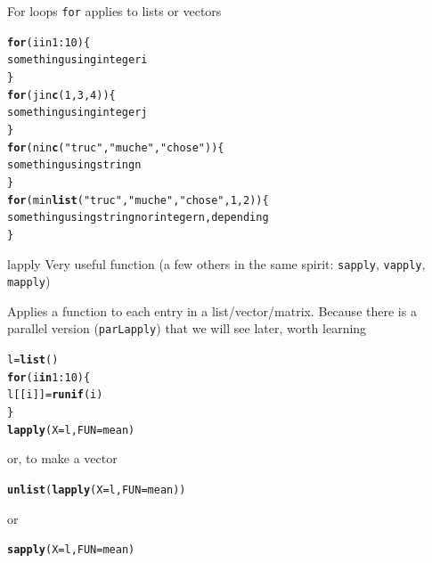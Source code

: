 \documentclass[aspectratio=169]{beamer}\usepackage[]{graphicx}\usepackage[]{xcolor}
\makeatletter
\newcommand{\hlnum}[1]{\textcolor[rgb]{0.686,0.059,0.569}{#1}}%
\newcommand{\hlsng}[1]{\textcolor[rgb]{0.192,0.494,0.8}{#1}}%
\newcommand{\hlopt}[1]{\textcolor[rgb]{0,0,0}{#1}}%
\newcommand{\hldef}[1]{\textcolor[rgb]{0.345,0.345,0.345}{#1}}%
\newcommand{\hlkwa}[1]{\textcolor[rgb]{0.161,0.373,0.58}{\textbf{#1}}}%
\newcommand{\hlkwb}[1]{\textcolor[rgb]{0.69,0.353,0.396}{#1}}%
\newcommand{\hlkwc}[1]{\textcolor[rgb]{0.333,0.667,0.333}{#1}}%
\newcommand{\hlkwd}[1]{\textcolor[rgb]{0.737,0.353,0.396}{\textbf{#1}}}%
\newenvironment{kframe}{%
 \def\at@end@of@kframe{}%
 \ifinner\ifhmode%
  \def\at@end@of@kframe{\end{minipage}}%
  \begin{minipage}{\columnwidth}%
 \fi\fi%
 \def\FrameCommand##1{\hskip\@totalleftmargin \hskip-\fboxsep
 \colorbox{shadecolor}{##1}\hskip-\fboxsep
     \hskip-\linewidth \hskip-\@totalleftmargin \hskip\columnwidth}%
 \MakeFramed {\advance\hsize-\width
   \@totalleftmargin\z@ \linewidth\hsize
   \@setminipage}}%
 {\par\unskip\endMakeFramed%
 \at@end@of@kframe}
\newenvironment{knitrout}{}{} %
\makeatother
\begin{document}
\begin{frame}[fragile]{For loops}
\texttt{for} applies to lists or vectors

\begin{knitrout}
\color{fgcolor}\begin{kframe}
\begin{alltt}
\hlkwd{for} (i in 1:10) \{
  something using integer i
\}
\hlkwd{for} (j in \hlkwd{c}(1,3,4)) \{
  something using integer j
\}
\hlkwd{for} (n in \hlkwd{c}(\hlsng{"truc"}, \hlsng{"muche"}, \hlsng{"chose"})) \{
  something using string n
\}
\hlkwd{for} (m in \hlkwd{list}(\hlsng{"truc"}, \hlsng{"muche"}, \hlsng{"chose"}, 1, 2)) \{
  something using string n or integer n, depending
\}
\end{alltt}
\end{kframe}
\end{knitrout}
\end{frame}

\begin{frame}[fragile]{lapply}
Very useful function (a few others in the same spirit: \texttt{sapply}, \texttt{vapply}, \texttt{mapply})

Applies a function to each entry in a list/vector/matrix. Because there is a parallel version (\texttt{parLapply}) that we will see later, worth learning

\begin{knitrout}
\color{fgcolor}\begin{kframe}
\begin{alltt}
\hldef{l} \hlkwb{=} \hlkwd{list}\hldef{()}
\hlkwa{for} \hldef{(i} \hlkwa{in} \hlnum{1}\hlopt{:}\hlnum{10}\hldef{) \{}
        \hldef{l[[i]]} \hlkwb{=} \hlkwd{runif}\hldef{(i)}
\hldef{\}}
\hlkwd{lapply}\hldef{(}\hlkwc{X} \hldef{= l,} \hlkwc{FUN} \hldef{= mean)}
\end{alltt}
\end{kframe}
\end{knitrout}

or, to make a vector

\begin{knitrout}
\color{fgcolor}\begin{kframe}
\begin{alltt}
\hlkwd{unlist}\hldef{(}\hlkwd{lapply}\hldef{(}\hlkwc{X} \hldef{= l,} \hlkwc{FUN} \hldef{= mean))}
\end{alltt}
\end{kframe}
\end{knitrout}

or

\begin{knitrout}
\color{fgcolor}\begin{kframe}
\begin{alltt}
\hlkwd{sapply}\hldef{(}\hlkwc{X} \hldef{= l,} \hlkwc{FUN} \hldef{= mean)}
\end{alltt}
\end{kframe}
\end{knitrout}
\end{frame}
\end{document}
